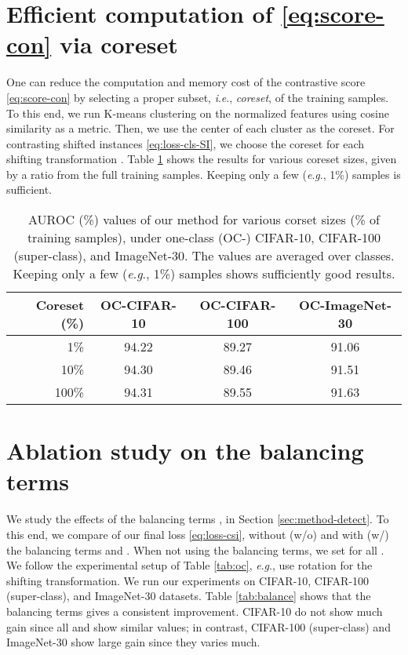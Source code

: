 \documentclass{article}
\newcommand{\ie}{\textit{i}.\textit{e}.}
\newcommand{\eg}{\textit{e}.\textit{g}.}
\begin{document}
 
 \section{Efficient computation of \eqref{eq:score-con} via coreset}
\label{appx:coreset}

One can reduce the computation and memory cost of the contrastive score \eqref{eq:score-con} by selecting a proper subset, \ie, \textit{coreset}, of the training samples. To this end, we run K-means clustering \citep{macqueen1967some} on the normalized features  using cosine similarity as a metric. Then, we use the center of each cluster as the coreset. For contrasting shifted instances \eqref{eq:loss-cls-SI}, we choose the coreset for each shifting transformation . Table \ref{tab:coreset} shows the results for various coreset sizes, given by a ratio from the full training samples. Keeping only a few (\eg, 1\%) samples is sufficient.


\begin{table}[h]
\centering\small
\caption{
AUROC (\%) values of our method for various corset sizes (\% of training samples), under one-class (OC-) CIFAR-10, CIFAR-100 (super-class), and ImageNet-30. The values are averaged over classes. Keeping only a few (\eg, 1\%) samples shows sufficiently good results.
}\label{tab:coreset}
\begin{tabular}{rccc}
\toprule
Coreset (\%) & OC-CIFAR-10 & OC-CIFAR-100 & OC-ImageNet-30 \\
\midrule
1\%   & 94.22 & 89.27 & 91.06 \\
10\%  & 94.30 & 89.46 & 91.51 \\
100\% & 94.31 & 89.55 & 91.63 \\
\bottomrule
\end{tabular}
\end{table}
 

 
\clearpage
\section{Ablation study on the balancing terms}
\label{appx:balance}

We study the effects of the balancing terms ,  in Section \ref{sec:method-detect}. To this end, we compare of our final loss \eqref{eq:loss-csi}, without (w/o) and with (w/) the balancing terms  and . When not using the balancing terms, we set  for all . We follow the experimental setup of Table \ref{tab:oc}, \eg, use rotation for the shifting transformation. We run our experiments on CIFAR-10, CIFAR-100 (super-class), and ImageNet-30 datasets. Table \ref{tab:balance} shows that the balancing terms gives a consistent improvement. CIFAR-10 do not show much gain since all  and  show similar values; in contrast, CIFAR-100 (super-class) and ImageNet-30 show large gain since they varies much.
\end{document}
